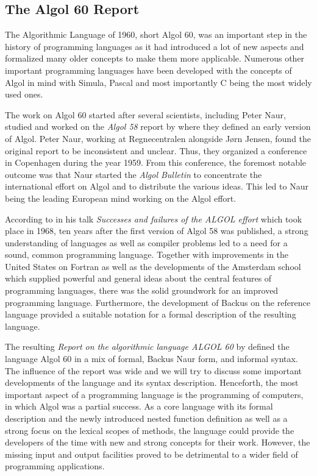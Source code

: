 \documentclass{article}
\begin{document}
\subsection{The Algol 60 Report}

The Algorithmic Language of 1960, short Algol 60, was an important step in the history of programming languages as it had introduced a lot of new aspects and formalized many older concepts to make them more applicable. Numerous other important programming languages have been developed with the concepts of Algol in mind with Simula, Pascal and most importantly C being the most widely used ones.

The work on Algol 60 started after several scientists, including Peter Naur, studied and worked on the \textit{Algol 58} report by \citet{baueralgol} where they defined an early version of Algol. Peter Naur, working at Regnecentralen alongside Jørn Jensen, found the original report to be inconsistent and unclear. Thus, they organized a conference in Copenhagen during the year 1959. From this conference, the foremost notable outcome was that Naur started the \textit{Algol Bulletin} to concentrate the international effort on Algol and to distribute the various ideas. This led to Naur being the leading European mind working on the Algol effort.

According to \citet{naur1968successes} in his talk \textit{Successes and failures of the ALGOL effort} which took place in 1968, ten years after the first version of Algol 58 was published, a strong understanding of languages as well as compiler problems led to a need for a sound, common programming language. Together with improvements in the United States on Fortran as well as the developments of the Amsterdam school which supplied powerful and general ideas about the central features of programming languages, there was the solid groundwork for an improved programming language. Furthermore, the development of Backus on the reference language provided a suitable notation for a formal description of the resulting language.

The resulting \textit{Report on the algorithmic language ALGOL 60} by \citet{backus1960report} defined the language Algol 60 in a mix of formal, Backus Naur form, and informal syntax. The influence of the report was wide and we will try to discuss some important developments of the language and its syntax description. Henceforth, the most important aspect of a programming language is the programming of computers, in which Algol was a partial success. As a core language with its formal description and the newly introduced nested function definition as well as a strong focus on the lexical scopes of methods, the language could provide the developers of the time with new and strong concepts for their work. However, the missing input and output facilities proved to be detrimental to a wider field of programming applications.
\end{document}
